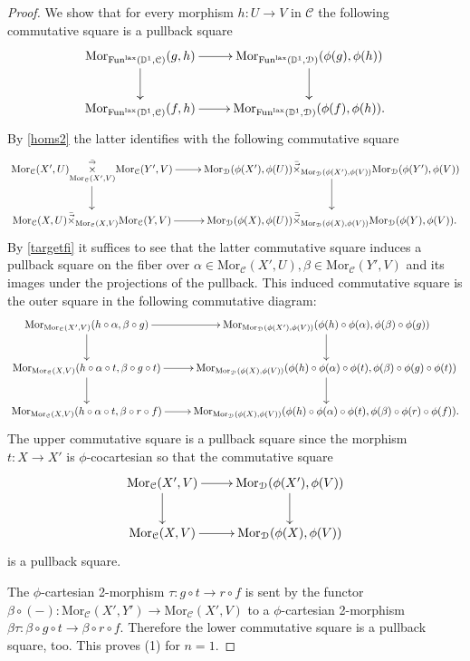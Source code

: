 \documentclass[10pt,oneside]{article}
\numberwithin{equation}{section} %
\numberwithin{figure}{section} %
\theoremstyle{plain}
\theoremstyle{definition}
\newcommand{\bD}{{\mathbb D}}
\newcommand{\mC}{{\mathcal C}}
\newcommand{\mD}{{\mathcal D}}
\newcommand{\Fun}{\mathrm{Fun}}
\newcommand{\lax}{{\mathrm{lax}}}
\newcommand{\Mor}{{\mathrm{Mor}}}
\begin{document}
\begin{proof}
We show that for every morphism $ h: U \to V$ in $\mC$ the following commutative square is a pullback square
\[
\xymatrix{
\Mor_{\Fun^\lax(\bD^1,\mC)}(g,h) \ar[r] \ar[d] & \Mor_{\Fun^\lax(\bD^1,\mD)}(\phi(g),\phi(h)) \ar[d] \\
\Mor_{\Fun^\lax(\bD^1,\mC)}(f,h) \ar[r] & \Mor_{\Fun^\lax(\bD^1,\mD)}(\phi(f),\phi(h)).
}
\]
By \cref{homs2} the latter identifies with the following commutative square
\[
\xymatrix{
\Mor_\mC(X',U) \underset{\Mor_\mC(X', V)}{{\overset{\bar{\to}}{{\times}}}} \Mor_\mC(Y', V) \ar[r] \ar[d] & \Mor_\mD(\phi(X'), \phi(U)) {\bar{\vec{\times}}}_{\Mor_\mD(\phi(X'), \phi(V))} \Mor_\mD(\phi(Y'),\phi(V)) \ar[d] \\
\Mor_\mC(X, U) {\bar{\vec{\times}}}_{\Mor_\mC(X, V)} \Mor_\mC(Y,V) \ar[r] & \Mor_\mD(\phi(X), \phi(U)) {\bar{\vec{\times}}}_{\Mor_\mD(\phi(X), \phi(V))} \Mor_\mD(\phi(Y),\phi(V)).
}
\]
By \cref{targetfi} it suffices to see that the latter commutative square
induces a pullback square on the fiber over $\alpha \in \Mor_\mC(X',U), \beta \in \Mor_\mC(Y', V)$ and its images under the projections of the pullback.
This induced commutative square is the outer square in the following commutative diagram:
\[
\xymatrix{
\Mor_{\Mor_\mC(X', V)}(h \circ \alpha, \beta \circ g) \ar[r] \ar[d] & \Mor_{\Mor_\mD(\phi(X'),\phi(V))}(\phi(h) \circ \phi(\alpha), \phi(\beta) \circ \phi(g)) \ar[d] \\
\Mor_{\Mor_\mC(X, V)}(h \circ\alpha \circ t, \beta \circ g \circ t) \ar[r]\ar[d] & \Mor_{\Mor_\mD(\phi(X), \phi(V))}(\phi(h) \circ \phi(\alpha) \circ \phi(t), \phi(\beta) \circ\phi(g) \circ \phi(t))\ar[d]
\\
\Mor_{\Mor_\mC(X, V)}(h \circ \alpha \circ t, \beta \circ r \circ f) \ar[r] & \Mor_{\Mor_\mD(\phi(X), \phi(V))}(\phi(h) \circ \phi(\alpha)\circ \phi(t), \phi(\beta) \circ \phi(r) \circ \phi(f)).
}
\]
The upper commutative square is a pullback square since the morphism $t: X \to X'$ is $\phi$-cocartesian so that the commutative square
\[
\xymatrix{
\Mor_\mC(X', V) \ar[r] \ar[d] & \Mor_\mD(\phi(X'),\phi(V)) \ar[d] \\
\Mor_\mC(X, V)\ar[r] & \Mor_\mD(\phi(X), \phi(V))
}
\]
is a pullback square.

The $\phi$-cartesian 2-morphism $ \tau: g \circ t \to r \circ f$ is 
sent by the functor $ \beta \circ (-):  \Mor_\mC(X', Y') \to \Mor_\mC(X', V)$ to a $\phi$-cartesian 2-morphism 
$\beta \tau: \beta \circ g \circ t \to \beta \circ r \circ f$.
Therefore the lower commutative square is a pullback square, too.
This proves (1) for $n=1$.


\end{proof}
\end{document}
